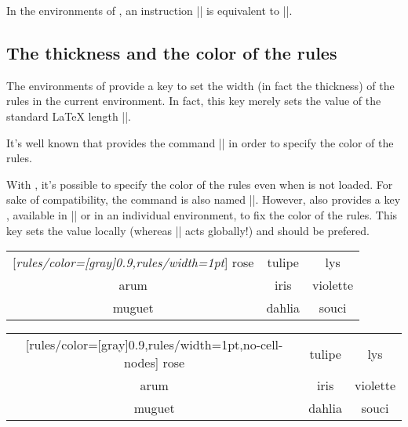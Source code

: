 \documentclass[dvipsnames]{article}%
\begin{document}
\medskip
In the environments of , an instruction || 
is equivalent to ||.


\subsection{The thickness and the color of the rules}


The environments of  provide a key  to
set the width (in fact the thickness) of the rules in the current environment.
In fact, this key merely sets the value of the standard LaTeX length
|\arrayrulewidth|.

\smallskip
It's well known that  provides the command |\arrayrulecolor| in
order to specify the color of the rules.

\smallskip
{}
With , it's possible to specify the color of the rules even when
 is not loaded. For sake of compatibility, the command is also
named |\arrayrulecolor|. However,  also provides a key
, available in |\NiceMatrixOptions| or in an individual 
environment, to fix the color of the rules. This key sets the value locally
(whereas |\arrayrulecolor| acts globally!) and should be prefered.

\medskip
\begin{Code}[width=15cm]
\begin{NiceTabular}{|ccc|}[\emph{rules/color=[gray]{0.9},rules/width=1pt}]
\hline
rose & tulipe & lys \\
arum & iris & violette \\
muguet & dahlia & souci \\
\hline
\end{NiceTabular}
\end{Code}
\hspace{-5cm}
\begin{NiceTabular}{|ccc|}%
  [rules/color=[gray]{0.9},rules/width=1pt,no-cell-nodes]
\hline
rose & tulipe & lys \\
arum & iris & violette \\
muguet & dahlia & souci \\
\hline
\end{NiceTabular}
\end{document}
